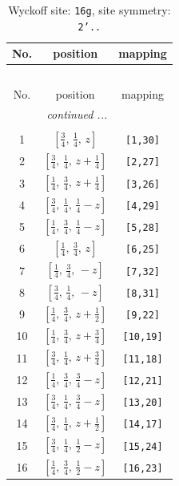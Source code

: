 \documentclass[fleqn,8pt]{jsarticle}
\begin{document}
\begin{longtable}{ccc}
\caption{Wyckoff site: {\tt 16g}, site symmetry: {\tt 2'..}}
 \\
 \hline \hline
No. & position & mapping \\ \hline \endfirsthead

\multicolumn{2}{l}{\tablename\ \thetable{}} \\
 \hline \hline
No. & position & mapping \\ \hline \endhead

 \hline \hline
\multicolumn{2}{r}{\footnotesize\it continued ...} \\ \endfoot

 \hline \hline
\multicolumn{2}{r}{} \\ \endlastfoot

1 & $\left[ \frac{3}{4},\, \frac{1}{4},\, z \right]$ & {\tt [1,30]} \\ \hline
2 & $\left[ \frac{3}{4},\, \frac{1}{4},\, z + \frac{1}{4} \right]$ & {\tt [2,27]} \\ \hline
3 & $\left[ \frac{1}{4},\, \frac{3}{4},\, z + \frac{1}{4} \right]$ & {\tt [3,26]} \\ \hline
4 & $\left[ \frac{3}{4},\, \frac{1}{4},\, \frac{1}{4} - z \right]$ & {\tt [4,29]} \\ \hline
5 & $\left[ \frac{1}{4},\, \frac{3}{4},\, \frac{1}{4} - z \right]$ & {\tt [5,28]} \\ \hline
6 & $\left[ \frac{1}{4},\, \frac{3}{4},\, z \right]$ & {\tt [6,25]} \\ \hline
7 & $\left[ \frac{1}{4},\, \frac{3}{4},\, - z \right]$ & {\tt [7,32]} \\ \hline
8 & $\left[ \frac{3}{4},\, \frac{1}{4},\, - z \right]$ & {\tt [8,31]} \\ \hline
9 & $\left[ \frac{1}{4},\, \frac{3}{4},\, z + \frac{1}{2} \right]$ & {\tt [9,22]} \\ \hline
10 & $\left[ \frac{1}{4},\, \frac{3}{4},\, z + \frac{3}{4} \right]$ & {\tt [10,19]} \\ \hline
11 & $\left[ \frac{3}{4},\, \frac{1}{4},\, z + \frac{3}{4} \right]$ & {\tt [11,18]} \\ \hline
12 & $\left[ \frac{1}{4},\, \frac{3}{4},\, \frac{3}{4} - z \right]$ & {\tt [12,21]} \\ \hline
13 & $\left[ \frac{3}{4},\, \frac{1}{4},\, \frac{3}{4} - z \right]$ & {\tt [13,20]} \\ \hline
14 & $\left[ \frac{3}{4},\, \frac{1}{4},\, z + \frac{1}{2} \right]$ & {\tt [14,17]} \\ \hline
15 & $\left[ \frac{3}{4},\, \frac{1}{4},\, \frac{1}{2} - z \right]$ & {\tt [15,24]} \\ \hline
16 & $\left[ \frac{1}{4},\, \frac{3}{4},\, \frac{1}{2} - z \right]$ & {\tt [16,23]} \\
\end{longtable}
\end{document}
